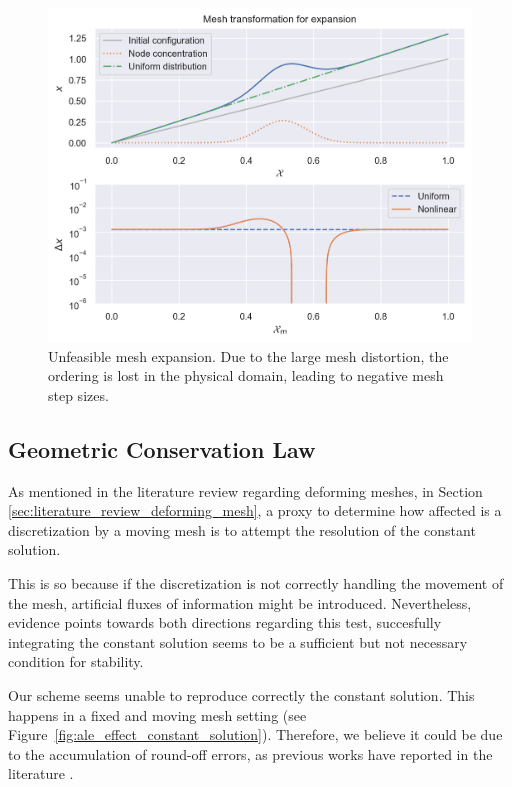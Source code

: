 \documentclass[../../thesis.tex]{subfiles}
\begin{document}
\newpage
\begin{figure}[h]
    \includegraphics[width =\columnwidth]{research_project/piston/figures/nonlinear_displacement/separable/mapping_mu_05_sigma_01_p_175_expansion.png}
    \caption{Unfeasible mesh expansion.
    Due to the large mesh distortion, the ordering is lost in the physical domain,
    leading to negative mesh step sizes.}
    \label{fig:mesh_disp_expansion_unfeasible}
\end{figure}

\subsection{Geometric Conservation Law}
As mentioned in the literature review regarding deforming meshes, 
in Section \ref{sec:literature_review_deforming_mesh},
a proxy to determine how affected is a discretization by a moving mesh
is to attempt the resolution of the constant solution.

This is so because if the discretization is not correctly handling the movement of the mesh,
artificial fluxes of information might be introduced. 
Nevertheless, evidence points towards both directions regarding this test,
succesfully integrating the constant solution seems to be a sufficient but not necessary condition for stability.

Our scheme seems unable to reproduce correctly the constant solution.
This happens in a fixed and moving mesh setting (see Figure~\ref{fig:ale_effect_constant_solution}).
Therefore, we believe it could be due to the accumulation of round-off errors, 
as previous works have reported in the literature \cite{liu2019balancing}.
\end{document}
